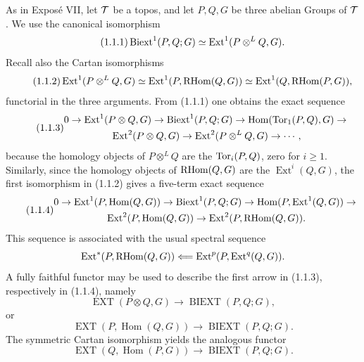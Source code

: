 \documentclass[11pt]{article}
\providecommand{\Hom}{\operatorname{Hom}}
\providecommand{\Ext}{\operatorname{Ext}}
\begin{document}
As in Exposé VII, let \(\mathcal T\) be a topos, and let \(P,Q,G\) be three abelian Groups of \(\mathcal T\).  We use the canonical isomorphism
\begin{equation}\tag{1.1.1}
        \Biext^1(P,Q;G)\simeq \Ext^1(P\otimes^L Q,G).
\end{equation}
Recall also the Cartan isomorphisms
\begin{equation}\tag{1.1.2}
 \Ext^1(P\otimes^L Q,G)
 \simeq \Ext^1(P,\RHom(Q,G))
 \simeq \Ext^1(Q,\RHom(P,G)),
\end{equation}
functorial in the three arguments.  From (1.1.1) one obtains the exact sequence
\begin{equation}\tag{1.1.3}
\begin{gathered}
0\to \Ext^1(P\otimes Q,G)\to \Biext^1(P,Q;G)
\to \Hom(\Torop_1(P,Q),G)\to{}\\
\Ext^2(P\otimes Q,G)\to \Ext^2(P\otimes^L Q,G)\to\cdots,
\end{gathered}
\end{equation}
because the homology objects of \(P\otimes^L Q\) are the \(\operatorname{Tor}_i(P,Q)\), zero for \(i\ge1\).  Similarly, since the homology objects of \(\operatorname{RHom}(Q,G)\) are the \(\Ext^i(Q,G)\), the first isomorphism in (1.1.2) gives a five-term exact sequence
\begin{equation}\tag{1.1.4}
\begin{gathered}
0\to \Ext^1(P,\Hom(Q,G))\to \Biext^1(P,Q;G)
\to \Hom(P,\Ext^1(Q,G))\to{}\\
\Ext^2(P,\Hom(Q,G))\to \Ext^2(P,\RHom(Q,G)).
\end{gathered}
\end{equation}
This sequence is associated with the usual spectral sequence
\[
        \Ext^*(P,\RHom(Q,G))\Longleftarrow
        \Ext^p(P,\Ext^q(Q,G)).
\]
A fully faithful functor may be used to describe the first arrow in (1.1.3), respectively in (1.1.4), namely
\begin{equation}\tag{1.1.5}
        \operatorname{EXT}(P\otimes Q,G)\to\operatorname{BIEXT}(P,Q;G),
\end{equation}
or
\begin{equation}\tag{1.1.6}
        \operatorname{EXT}(P,\Hom(Q,G))\to\operatorname{BIEXT}(P,Q;G).
\end{equation}
The symmetric Cartan isomorphism yields the analogous functor
\begin{equation}\tag{1.1.7}
        \operatorname{EXT}(Q,\Hom(P,G))\to\operatorname{BIEXT}(P,Q;G).
\end{equation}
\end{document}
